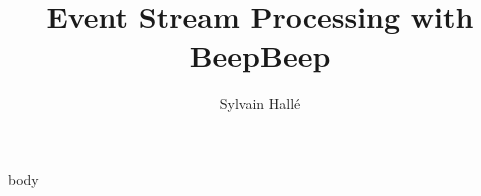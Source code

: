 \documentclass{lifmanual}
\title{Event Stream Processing with BeepBeep}
\author{Sylvain Hallé}
\begin{document}

\tableofcontents
\newpage

{body}

\printindex
\end{document}
